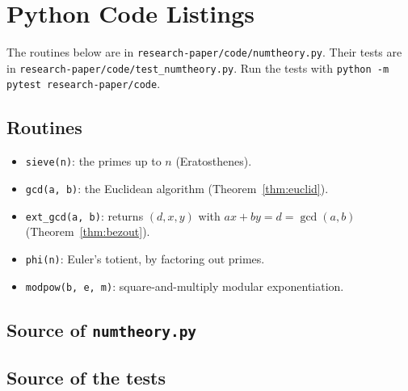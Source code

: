 \chapter{Python Code Listings}\label{app:code}

The routines below are in \texttt{research-paper/code/numtheory.py}. Their tests are in \texttt{research-paper/code/test\_numtheory.py}. Run the tests with \texttt{python -m pytest research-paper/code}.

\section{Routines}

\begin{itemize}
  \item \texttt{sieve(n)}: the primes up to $n$ (Eratosthenes).
  \item \texttt{gcd(a, b)}: the Euclidean algorithm (Theorem~\ref{thm:euclid}).
  \item \texttt{ext\_gcd(a, b)}: returns $(d,x,y)$ with $ax+by=d=\gcd(a,b)$ (Theorem~\ref{thm:bezout}).
  \item \texttt{phi(n)}: Euler's totient, by factoring out primes.
  \item \texttt{modpow(b, e, m)}: square-and-multiply modular exponentiation.
\end{itemize}

\section{Source of \texttt{numtheory.py}}



\section{Source of the tests}


